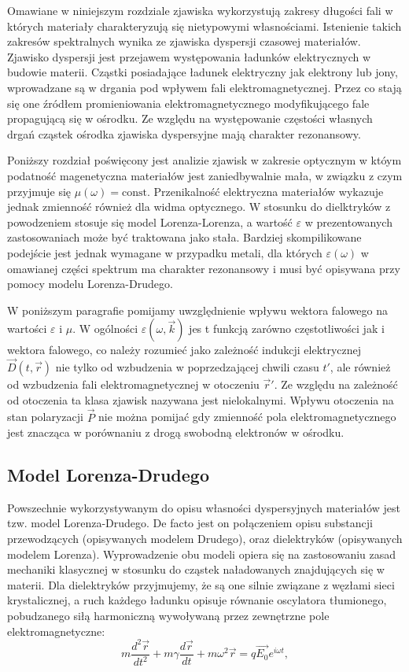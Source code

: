 \label{subart:lorenz-drude}
Omawiane w niniejszym rozdziale zjawiska wykorzystują zakresy długości fali w których materiały charakteryzują się nietypowymi własnościami. Istenienie takich zakresów spektralnych wynika ze zjawiska dyspersji czasowej materiałów. Zjawisko dyspersji jest przejawem występowania ładunków elektrycznych w budowie materii. Cząstki posiadające ładunek elektryczny jak elektrony lub jony, wprowadzane są w drgania pod wpływem fali elektromagnetycznej. Przez co stają się one źródłem promieniowania elektromagnetycznego modyfikującego fale propagującą się w ośrodku. Ze względu na występowanie częstości własnych drgań cząstek ośrodka zjawiska dyspersyjne mają charakter rezonansowy.

Poniższy rozdział poświęcony jest analizie zjawisk w zakresie optycznym w któym podatność magenetyczna materiałów jest zaniedbywalnie mała, w związku z czym przyjmuje się $\mu(\omega)=\textrm{const}$. Przenikalność elektryczna materiałów wykazuje jednak zmienność również dla widma optycznego. W stosunku do dielktryków z powodzeniem stosuje się model Lorenza-Lorenza, a wartość $\varepsilon$ w prezentowanych zastosowaniach może być traktowana jako stała. Bardziej skompilikowane podejście jest jednak wymagane w przypadku metali, dla których $\varepsilon(\omega)$ w omawianej części spektrum ma charakter rezonansowy i musi być opisywana przy pomocy modelu Lorenza-Drudego.

W poniższym paragrafie pomijamy uwzględnienie wpływu wektora falowego na wartości $\varepsilon$ i $\mu$. W ogólności $\varepsilon(\omega,\vec{k})$ jes t funkcją zarówno częstotliwości jak i wektora falowego, co należy rozumieć jako zależność indukcji elektrycznej $\vec{D}(t,\vec{r})$ nie tylko od wzbudzenia w poprzedzającej chwili czasu $t'$, ale również od wzbudzenia fali elektromagnetycznej w otoczeniu $\vec{r}'$. Ze względu na zależność od otoczenia ta klasa zjawisk nazywana jest nielokalnymi. Wpływu otoczenia na stan polaryzacji $\vec{P}$ nie można pomijać gdy zmienność pola elektromagnetycznego jest znacząca w porównaniu z drogą swobodną elektronów w ośrodku.

\subsection{Model Lorenza-Drudego}
Powszechnie wykorzystywanym do opisu własności dyspersyjnych materiałów jest tzw. model Lorenza-Drudego. De facto jest on połączeniem opisu substancji przewodzących (opisywanych modelem Drudego), oraz dielektryków (opisywanych modelem Lorenza). Wyprowadzenie obu modeli opiera się na zastosowaniu zasad mechaniki klasycznej w stosunku do cząstek naładowanych znajdujących się w materii. Dla dielektryków przyjmujemy, że są one silnie związane z węzłami sieci krystalicznej, a ruch każdego ładunku opisuje równanie oscylatora tłumionego, pobudzanego siłą harmoniczną wywoływaną przez zewnętrzne pole elektromagnetyczne:
\begin{equation}
m \frac{d^2 \vec{r}}{dt^2} + m \gamma \frac{d \vec{r}}{dt} + m \omega^2 \vec{r} = q \vec{E_0} e^{i \omega t},
\label{eq:newton-lorenz}
\end{equation}

